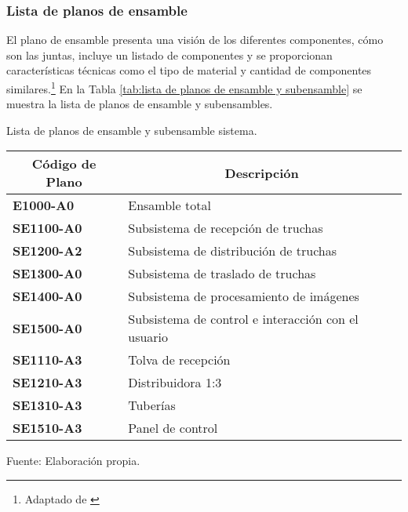 \subsubsection{Lista de planos de ensamble}

El plano de ensamble presenta una visión de los diferentes componentes, cómo son las juntas, incluye un listado de componentes y se proporcionan características técnicas como el  tipo de material y cantidad de componentes similares.\footnote{Adaptado de \cite{Goetsch2010}} En la Tabla \ref{tab:lista de planos de ensamble y subensamble} se muestra la lista de planos de ensamble y subensambles. 

\begin{mytable}[H]
	\footnotesize\centering
	\caption{Lista de planos de ensamble y subensamble sistema.}
	\label{tab:lista de planos de ensamble y subensamble}
	\begin{tabular}{|l|l|}
		\hline
		\multicolumn{1}{|c|}{\textbf{Código de Plano}} & \multicolumn{1}{c|}{\textbf{Descripción}} \\ \hline
		\textbf{E1000-A0}         & Ensamble total  \\ \hline
		\textbf{SE1100-A0}        & Subsistema de recepción de truchas  \\ \hline
		\textbf{SE1200-A2}        & Subsistema de distribución de truchas \\ \hline
		\textbf{SE1300-A0}        & Subsistema de traslado de truchas \\ \hline
		\textbf{SE1400-A0}        & Subsistema de procesamiento de imágenes \\ \hline
		\textbf{SE1500-A0}        & Subsistema de control e interacción con el usuario\\ \hline
		\textbf{SE1110-A3}        & Tolva de recepción \\ \hline
		\textbf{SE1210-A3}        & Distribuidora 1:3 \\ \hline
		\textbf{SE1310-A3}        & Tuberías \\ \hline 
		\textbf{SE1510-A3}        & Panel de control \\ \hline
	\end{tabular}
	\begin{myflushcenteraftertable}	
		Fuente: Elaboración propia.
	\end{myflushcenteraftertable}
\end{mytable}

\vspace{-1.0 em}
